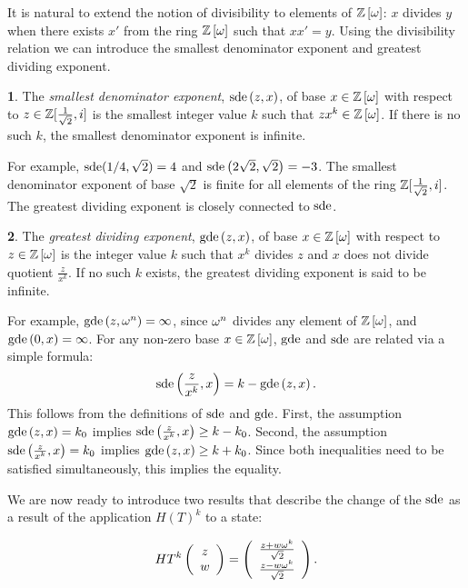 \documentclass[english,journal]{extarticle}
\theoremstyle{plain}
\theoremstyle{plain}
\theoremstyle{plain}
\theoremstyle{definition}
\newtheorem{defn}{\protect\definitionname}
\theoremstyle{plain}
\theoremstyle{plain}
\providecommand{\definitionname}{\inputencoding{latin9}Definition}
\begin{document}
It is natural to extend the notion of divisibility to elements of $\mathbb{Z}\left[\omega\right]$:
$x$ divides $y$ when there exists $x'$ from the ring $\mathbb{Z}\left[\omega\right]$
such that $xx'=y$. Using the divisibility relation we can introduce
the smallest denominator exponent and greatest dividing exponent.
\begin{defn}
The {\em smallest denominator exponent}, $\mathrm{sde}\left(z,x\right)$, of base
$x\in\mathbb{Z}\left[\omega\right]$ with respect to $z\in\mathbb{Z}[\frac{1}{\sqrt{2}},i]$ is the smallest integer value $k$ such that $zx^{k}\in\mathbb{Z}\left[\omega\right]$.
If there is no such $k$, the smallest denominator exponent is infinite. 
\end{defn}
For example, $\mathrm{sde}(1/4,\sqrt{2})=4$ and 
$\mathrm{sde}\left(2\sqrt{2},\sqrt{2}\right)=-3$.
The smallest denominator exponent of base $\sqrt{2}$ is finite
for all elements of the ring $\mathbb{Z}[\frac{1}{\sqrt{2}},i]$.  The greatest dividing exponent is closely
connected to $\mathrm{sde}$. 
\begin{defn}
The {\em greatest dividing exponent}, $\mathbf{\mathrm{gde}}\left(z,x\right)$, of base $x\in\mathbb{Z}\left[\omega\right]$
with respect to $z\in\mathbb{Z}\left[\omega\right]$ is the integer value $k$ such that
$x^{k}$ divides $z$ and $x$ does not divide quotient $\frac{z}{x^k}$.
If no such $k$ exists, the greatest dividing exponent is
said to be infinite. 
\end{defn}
For example, $\mathbf{\mathrm{gde}}\left(z,\omega^{n}\right)=\infty$, since $\omega^{n}$
divides any element of $\mathbb{Z}\left[\omega\right]$, and $\mathbf{\mathrm{gde}}\left(0,x\right)=\infty$.
For any non-zero base $x\in\mathbb{Z}\left[\omega\right]$, $\mathbf{\mathrm{gde}}$ and $\mathrm{sde}$ are related via a simple formula:
\begin{equation}
\mathrm{sde}\left(\frac{z}{x^{k}},x\right)=k-\mathbf{\mathrm{gde}}\left(z,x\right)\label{eq:gdesde}.
\end{equation}
This follows from the definitions of $\mathrm{sde}$ and $\mathbf{\mathrm{gde}}$. First, the
assumption $\mathbf{\mathrm{gde}}\left(z,x\right)=k_{0}$ implies
$\mathrm{sde}\left(\frac{z}{x^{k}},x\right)\ge k-k_{0}$.
Second, the assumption $\mathrm{sde}\left(\frac{z}{x^{k}},x\right)=k_{0}$
implies $\mathbf{\mathrm{gde}}\left(z,x\right)\ge k+k_{0}$.  Since both inequalities need to be satisfied 
simultaneously, this implies the equality. 

We are now ready to introduce
two results that describe the change of the $\mathrm{sde}$ as a result of the application
$H\left(T\right)^{k}$ to a state: 

\[
HT^{k}\left(\begin{array}{c}
z\\
w
\end{array}\right)=\left(\begin{array}{c}
\frac{z+w\omega^{k}}{\sqrt{2}}\\
\frac{z-w\omega^{k}}{\sqrt{2}}
\end{array}\right).
\]
\end{document}
